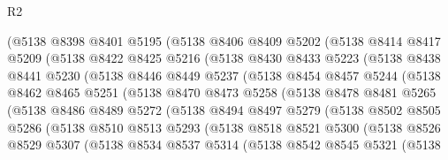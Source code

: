 \begin{lexlean}{R2}
\begin{coremodule}
        (@5138
          @8398
          @8401
          @5195
          (@5138
            @8406
            @8409
            @5202
            (@5138
              @8414
              @8417
              @5209
              (@5138
                @8422
                @8425
                @5216
                (@5138
                  @8430
                  @8433
                  @5223
                  (@5138
                    @8438
                    @8441
                    @5230
                    (@5138
                      @8446
                      @8449
                      @5237
                      (@5138
                        @8454
                        @8457
                        @5244
                        (@5138
                          @8462
                          @8465
                          @5251
                          (@5138
                            @8470
                            @8473
                            @5258
                            (@5138
                              @8478
                              @8481
                              @5265
                              (@5138
                                @8486
                                @8489
                                @5272
                                (@5138
                                  @8494
                                  @8497
                                  @5279
                                  (@5138
                                    @8502
                                    @8505
                                    @5286
                                    (@5138
                                      @8510
                                      @8513
                                      @5293
                                      (@5138
                                        @8518
                                        @8521
                                        @5300
                                        (@5138
                                          @8526
                                          @8529
                                          @5307
                                          (@5138
                                            @8534
                                            @8537
                                            @5314
                                            (@5138
                                              @8542
                                              @8545
                                              @5321
                                              (@5138

\end{coremodule}
\end{lexlean}
